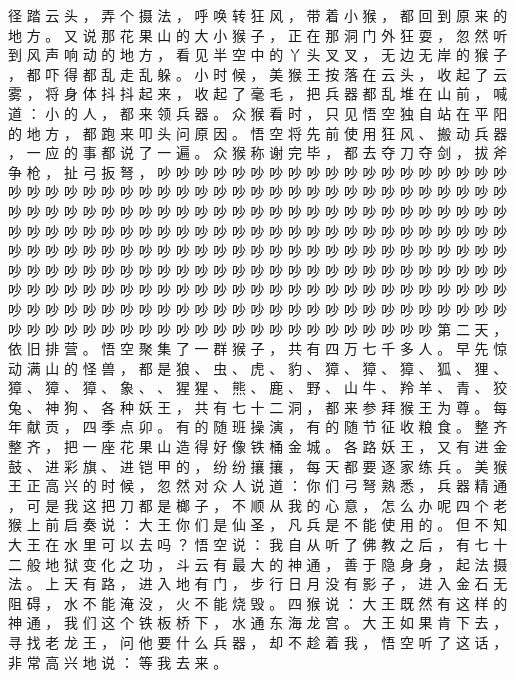 {径 踏 云 头 ， 弄 个 摄 法 ， 呼 唤 转 狂 风 ， 带 着 小 猴 ， 都 回 到 原 来 的 地 方 。
又 说 那 花 果 山 的 大 小 猴 子 ， 正 在 那 洞 门 外 狂 耍 ， 忽 然 听 到 风 声 响 动 的 地 方 ， 看 见 半 空 中 的 丫 头 叉 叉 ， 无 边 无 岸 的 猴 子 ， 都 吓 得 都 乱 走 乱 躲 。
小 时 候 ， 美 猴 王 按 落 在 云 头 ， 收 起 了 云 雾 ， 将 身 体 抖 抖 起 来 ， 收 起 了 毫 毛 ， 把 兵 器 都 乱 堆 在 山 前 ， 喊 道 ： 小 的 人 ， 都 来 领 兵 器 。
众 猴 看 时 ， 只 见 悟 空 独 自 站 在 平 阳 的 地 方 ， 都 跑 来 叩 头 问 原 因 。
悟 空 将 先 前 使 用 狂 风 、 搬 动 兵 器 ， 一 应 的 事 都 说 了 一 遍 。
众 猴 称 谢 完 毕 ， 都 去 夺 刀 夺 剑 ， 拔 斧 争 枪 ， 扯 弓 扳 弩 ， 吵 吵 吵 吵 吵 吵 吵 吵 吵 吵 吵 吵 吵 吵 吵 吵 吵 吵 吵 吵 吵 吵 吵 吵 吵 吵 吵 吵 吵 吵 吵 吵 吵 吵 吵 吵 吵 吵 吵 吵 吵 吵 吵 吵 吵 吵 吵 吵 吵 吵 吵 吵 吵 吵 吵 吵 吵 吵 吵 吵 吵 吵 吵 吵 吵 吵 吵 吵 吵 吵 吵 吵 吵 吵 吵 吵 吵 吵 吵 吵 吵 吵 吵 吵 吵 吵 吵 吵 吵 吵 吵 吵 吵 吵 吵 吵 吵 吵 吵 吵 吵 吵 吵 吵 吵 吵 吵 吵 吵 吵 吵 吵 吵 吵 吵 吵 吵 吵 吵 吵 吵 吵 吵 吵 吵 吵 吵 吵 吵 吵 吵 吵 吵 吵 吵 吵 吵 吵 吵 吵 吵 吵 吵 吵 吵 吵 吵 吵 吵 吵 吵 吵 吵 吵 吵 吵 吵 吵 吵 吵 吵 吵 吵 吵 吵 吵 吵 吵 吵 吵 吵 吵 吵 吵 吵 吵 吵 吵 吵 吵 吵 吵 吵 吵 吵 吵 吵 吵 吵 吵 吵 吵 吵 吵 吵 吵 吵 吵 吵 吵 吵 吵 吵 吵 吵 吵 吵 吵 吵 吵 吵 吵 吵 吵 吵 吵 吵 吵 吵 吵 吵 吵 吵 吵 吵 吵 吵 吵 吵 吵 吵
第 二 天 ， 依 旧 排 营 。
悟 空 聚 集 了 一 群 猴 子 ， 共 有 四 万 七 千 多 人 。
早 先 惊 动 满 山 的 怪 兽 ， 都 是 狼 、 虫 、 虎 、 豹 、 獐 、 獐 、 獐 、 狐 、 狸 、 獐 、 獐 、 獐 、 象 、 、 猩 猩 、 熊 、 鹿 、 野 、 山 牛 、 羚 羊 、 青 、 狡 兔 、 神 狗 、 各 种 妖 王 ， 共 有 七 十 二 洞 ， 都 来 参 拜 猴 王 为 尊 。
每 年 献 贡 ， 四 季 点 卯 。
有 的 随 班 操 演 ， 有 的 随 节 征 收 粮 食 。
整 齐 整 齐 ， 把 一 座 花 果 山 造 得 好 像 铁 桶 金 城 。
各 路 妖 王 ， 又 有 进 金 鼓 、 进 彩 旗 、 进 铠 甲 的 ， 纷 纷 攘 攘 ， 每 天 都 要 逐 家 练 兵 。
美 猴 王 正 高 兴 的 时 候 ， 忽 然 对 众 人 说 道 ： 你 们 弓 弩 熟 悉 ， 兵 器 精 通 ， 可 是 我 这 把 刀 都 是 榔 子 ， 不 顺 从 我 的 心 意 ， 怎 么 办 呢 四 个 老 猴 上 前 启 奏 说 ： 大 王 你 们 是 仙 圣 ， 凡 兵 是 不 能 使 用 的 。
但 不 知 大 王 在 水 里 可 以 去 吗 ？ 悟 空 说 ： 我 自 从 听 了 佛 教 之 后 ， 有 七 十 二 般 地 狱 变 化 之 功 ， 斗 云 有 最 大 的 神 通 ， 善 于 隐 身 身 ， 起 法 摄 法 。
上 天 有 路 ， 进 入 地 有 门 ， 步 行 日 月 没 有 影 子 ， 进 入 金 石 无 阻 碍 ， 水 不 能 淹 没 ， 火 不 能 烧 毁 。
四 猴 说 ： 大 王 既 然 有 这 样 的 神 通 ， 我 们 这 个 铁 板 桥 下 ， 水 通 东 海 龙 宫 。
大 王 如 果 肯 下 去 ， 寻 找 老 龙 王 ， 问 他 要 什 么 兵 器 ， 却 不 趁 着 我 ， 悟 空 听 了 这 话 ， 非 常 高 兴 地 说 ： 等 我 去 来 。
}
